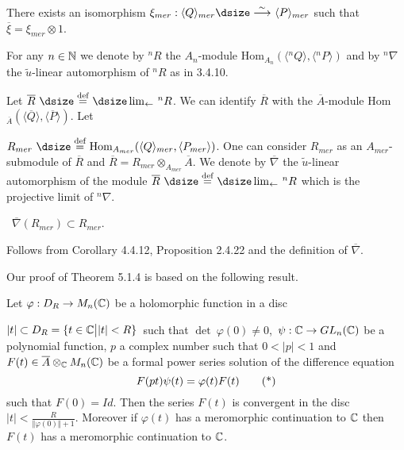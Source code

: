     There exists an isomorphism  $\xi_{mer}: \langle
Q\rangle_{mer}
{\dsize\buildrel{\sim}\over\longrightarrow}\ \langle P\rangle_{mer}$  such that
$\overline{\xi} = \xi_{mer} \otimes 1$.
\endproclaim

  For any $n \in {\Bbb N}$  we denote by ${}^nR$  the $A_n$-module
Hom$_{A_n}(\langle {}^nQ\rangle, \langle {}^nP\rangle)$  and  by
${}^n\nabla$  the $\widetilde{u}$-linear automorphism of ${}^nR$  as in
3.4.10.
\endproclaim

Let  $\overline{R}\ {\dsize\buildrel{\text{def}}\over =}\
{\dsize\lim_{\leftarrow}}\
{}^nR$.  We can identify $\overline{R}$   with the  $\overline{A}$-module
\quad
Hom$_{\overline A}(\langle \overline{Q}\rangle, \langle \overline{P}\rangle)$.
Let

\noindent
$R_{mer}\ {\dsize\buildrel{\text{def}}\over =}\  \text{Hom}_{A_{mer}}
(\langle Q\rangle_{mer}, \langle P_{mer}\rangle)$.  One can consider $R_{mer}$
as an
$A_{mer}$-submodule of  $\overline{R}$ and $\overline{R} =
R_{mer} \otimes_{A_{mer}} \overline{A}$.  We denote by  $\overline{\nabla}$
the $\widetilde{u}$-linear automorphism of the module
$\overline{R}\ {\dsize\buildrel{\text{def}}\over =}\ {\dsize\lim_{\leftarrow}}\
{}^nR$  which is the projective limit of ${}^n\nabla$.

\proclaim{5.1.5\ Lemma}\ $\overline{\nabla}(R_{mer}) \subset R_{mer}$.
\endproclaim

\demo{Proof}  Follows from Corollary 4.4.12, Proposition 2.4.22 and the
definition of $\overline{\nabla}$.
\enddemo

  Our proof of Theorem 5.1.4  is based on the following
result.


  Let  $\varphi: D_R \to M_n({\Bbb C})$  be a holomorphic
function in a disc

\noindent
$|t| \subset D_R = \{ t \in {\Bbb C}\big\vert |t| < R\}$\  such that
$\det\ \varphi(0) \ne 0$,\ $\psi: {\Bbb C} \to GL_n({\Bbb C})$  be
a polynomial function, $p$ a complex number such that  $0 < |p| < 1$  and
$F(t) \in \overline{A} \otimes_{\Bbb C} M_n({\Bbb C})$  be a formal power
series solution of the difference equation
$$
F(pt)\psi(t) = \varphi(t) F(t)   \tag *
$$
such that  $F(0) = Id$.  Then the series  $F(t)$  is convergent in the disc
$|t| < {\frac{R}{\Vert \varphi(0)\Vert + 1}}$.   Moreover if  $\varphi(t)$
has a meromorphic continuation to ${\Bbb C}$  then $F(t)$  has a meromorphic
continuation to ${\Bbb C}$.
\endproclaim

